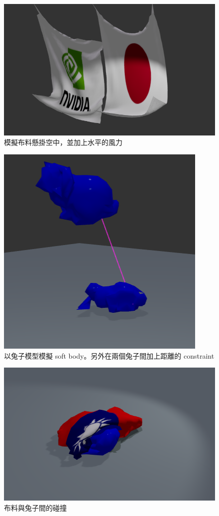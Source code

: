 \documentclass{article}
\begin{document}
\begin{figure}[!ht]
  \centering
  \includegraphics[width=0.6\linewidth]{figures/flag2.png}
  \caption{模擬布料懸掛空中，並加上水平的風力}
\end{figure}

\begin{figure}[!ht]
  \centering
  \includegraphics[width=0.6\linewidth]{figures/bunny.png}
  \caption{以兔子模型模擬 soft body。另外在兩個兔子間加上距離的 constraint}
\end{figure}

\begin{figure}[!ht]
  \centering
  \includegraphics[width=0.6\linewidth]{figures/collision.png}
  \caption{布料與兔子間的碰撞}
\end{figure}
\end{document}
